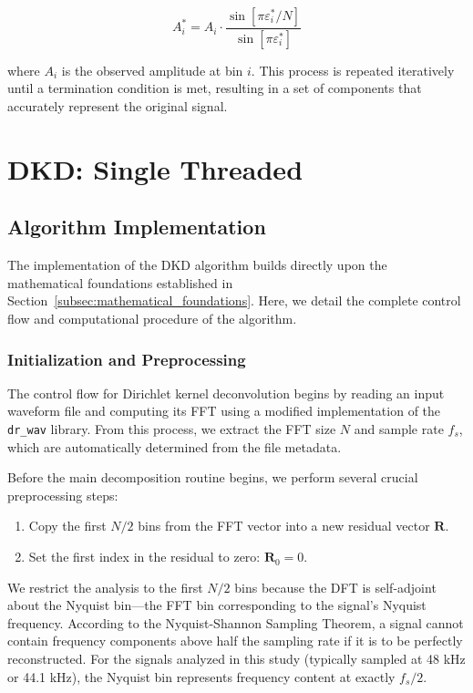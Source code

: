 \documentclass[11pt,twoside]{report}
\numberwithin{thm}{section}
\numberwithin{equation}{section}
\begin{document}
\begin{equation}
\label{eq:amplitude_correction}
A_i^* = A_i \cdot \frac{\sin[\pi \varepsilon_i^*/N]}{\sin[\pi \varepsilon_i^*]}
\end{equation}

where $A_i$ is the observed amplitude at bin $i$. This process is repeated iteratively until a termination condition is met, resulting in a set of components that accurately represent the original signal.

\section{DKD: Single Threaded}


\subsection{Algorithm Implementation}
\label{subsec:algorithm_implementation}

The implementation of the DKD algorithm builds directly upon the mathematical foundations established in Section~\ref{subsec:mathematical_foundations}. Here, we detail the complete control flow and computational procedure of the algorithm.

\subsubsection{Initialization and Preprocessing}

The control flow for Dirichlet kernel deconvolution begins by reading an input waveform file and computing its FFT using a modified implementation of the \texttt{dr\_wav} library. From this process, we extract the FFT size $N$ and sample rate $f_s$, which are automatically determined from the file metadata.

Before the main decomposition routine begins, we perform several crucial preprocessing steps:

\begin{enumerate}
    \item Copy the first $N/2$ bins from the FFT vector into a new residual vector $\mathbf{R}$.
    \item Set the first index in the residual to zero: $\mathbf{R}_0 = 0$.
\end{enumerate}

We restrict the analysis to the first $N/2$ bins because the DFT is self-adjoint about the Nyquist bin—the FFT bin corresponding to the signal's Nyquist frequency. According to the Nyquist-Shannon Sampling Theorem, a signal cannot contain frequency components above half the sampling rate if it is to be perfectly reconstructed. For the signals analyzed in this study (typically sampled at 48 kHz or 44.1 kHz), the Nyquist bin represents frequency content at exactly $f_s/2$.
\end{document}
